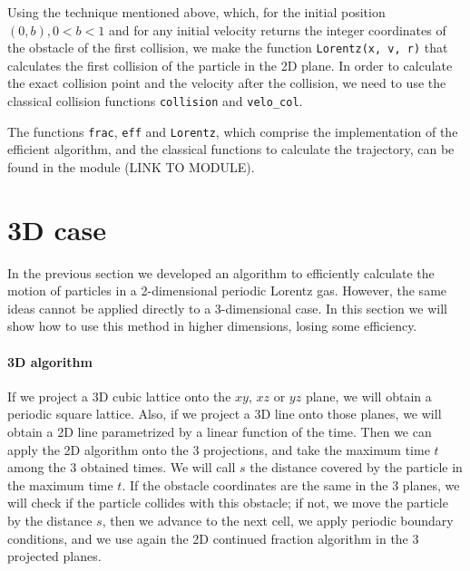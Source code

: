 \documentclass[prl,amsmath,amssymb, twocolumn, showpacs]{revtex4-1}
\begin{document}
Using the technique mentioned above, which, for the initial position $(0, b), 0 < b < 1$ and for any initial velocity returns the integer coordinates of the obstacle of the first collision, we make the function \texttt{Lorentz(x, v, r)} that calculates the first collision of the particle in the 2D plane. In order to calculate the exact collision point and the velocity after the collision, we need to use the classical collision functions \texttt{collision} and \texttt{velo\_col}.

The functions \texttt{frac}, \texttt{eff} and \texttt{Lorentz}, which comprise the implementation of the efficient algorithm, and the classical functions to calculate the trajectory, can be found in the module (LINK TO MODULE).


\section{3D case}

In the previous section we developed an algorithm to efficiently calculate the motion of particles in a 2-dimensional periodic Lorentz gas. However, the same ideas cannot be applied directly to a 3-dimensional case. In this section we will show how to use this method in higher dimensions, losing some efficiency.

\paragraph{3D algorithm} If we project a 3D cubic lattice onto the $xy$, $xz$ or $yz$ plane, we will obtain a periodic square lattice. Also, if we project a 3D line onto those planes, we will obtain a 2D line parametrized by a linear function of the time. 
Then we can apply the 2D algorithm onto the 3 projections, and take the maximum time $t$ among the 3 obtained times. We will call $s$ the distance covered by the particle in the maximum time $t$. If the obstacle coordinates are the same in the 3 planes, we will check if the particle collides with this obstacle; if not, we move the particle by the distance $s$, then we advance to the next cell, we apply periodic boundary conditions, and we use again the 2D continued fraction algorithm in the 3 projected planes. 
\end{document}
